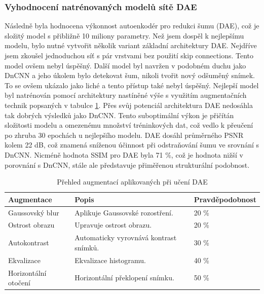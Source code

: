 \documentclass[male,czech,api_ing]{thesis}
\begin{document}
\subsubsection{Vyhodnocení natrénovaných modelů sítě DAE}
Následně byla hodnocena výkonnost autoenkodér pro redukci šumu (DAE), což je složitý model s přibližně 10 miliony parametry. Než jsem dospěl k nejlepšímu modelu, bylo nutné vytvořit několik variant základní architektury DAE. Nejdříve jsem zkoušel jednoduchou síť s pár vrstvami bez použití skip connections. Tento model ovšem nebyl úspěšný. Další model byl navržen v podobném duchu jako DnCNN a jeho úkolem bylo detekovat šum, nikoli tvořit nový odšuměný snímek. To se ovšem ukázalo jako liché a tento přístup také nebyl úspěšný. Nejlepší model byl natrénován pomocí architektury nastíněné výše s využitím augmentačních technik popsaných v tabulce \ref{tab:DAE_augmentation}. Přes svůj potenciál architektura DAE nedosáhla tak dobrých výsledků jako DnCNN. Tento suboptimální výkon je přičítán složitosti modelu a omezenému množství tréninkových dat, což vedlo k přeučení po zhruba 30 epochách u nejlepšího modelu. DAE dosáhl průměrného PSNR kolem 22 dB, což znamená sníženou účinnost při odstraňování šumu ve srovnání s DnCNN. Nicméně hodnota SSIM pro DAE byla 71 \%, což je hodnota nižší v porovnání s DnCNN, stále ale představuje přiměřenou strukturální podobnost.

\begin{table}[h]
    \centering
    \begin{tabular}{|l|l|l|}
    \hline
    \textbf{Augmentace}  & \textbf{Popis}                            & \textbf{Pravděpodobnost}  \\ \hline
    Gaussovský blur      & Aplikuje Gaussovské rozostření.           &  20 \%                     \\ \hline
    Ostrost obrazu       & Upravuje ostrost obrazu.                  &  20 \%                     \\ \hline
    Autokontrast         & Automaticky vyrovnává kontrast snímků.    &  30 \%                     \\ \hline
    Ekvalizace           & Ekvalizace histogramu.                    &  40 \%                     \\ \hline
    Horizontální otočení & Horizontální překlopení snímku.           &  50 \%                     \\ \hline
    \end{tabular}
    \caption{Přehled augmentací aplikovaných při učení DAE}
    \label{tab:DAE_augmentation}
\end{table}
\end{document}
